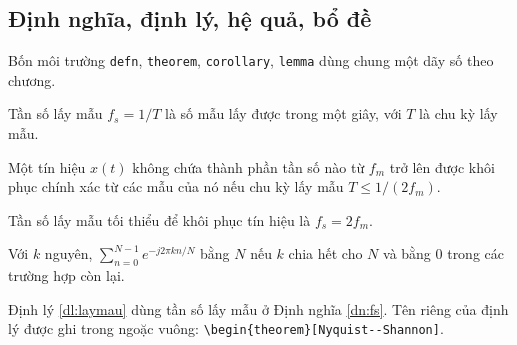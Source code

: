 \subsection{Định nghĩa, định lý, hệ quả, bổ đề}
Bốn môi trường \texttt{defn}, \texttt{theorem}, \texttt{corollary}, \texttt{lemma} dùng chung một dãy số theo chương.
\begin{defn}
    \label{dn:fs}
    Tần số lấy mẫu $f_s = 1/T$ là số mẫu lấy được trong một giây, với $T$ là chu kỳ lấy mẫu.
\end{defn}
\begin{theorem}
    \label{dl:laymau}
    Một tín hiệu $x(t)$ không chứa thành phần tần số nào từ $f_m$ trở lên được khôi phục chính xác từ các mẫu của nó nếu chu kỳ lấy mẫu $T \le 1/(2 f_m)$.
\end{theorem}
\begin{corollary}
    Tần số lấy mẫu tối thiểu để khôi phục tín hiệu là $f_s = 2 f_m$.
\end{corollary}
\begin{lemma}
    Với $k$ nguyên, $\sum_{n=0}^{N-1} e^{-j 2\pi k n / N}$ bằng $N$ nếu $k$ chia hết cho $N$ và bằng 0 trong các trường hợp còn lại.
\end{lemma}
Định lý \ref{dl:laymau} dùng tần số lấy mẫu ở Định nghĩa \ref{dn:fs}. Tên riêng của định lý được ghi trong ngoặc vuông: \verb|\begin{theorem}[Nyquist--Shannon]|.

\clearpage
